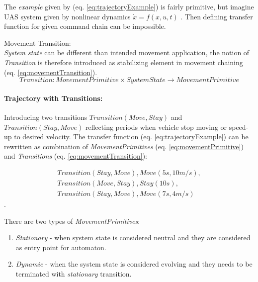     The \emph{example} given by (eq. \ref{eq:trajectoryExample}) is fairly primitive, but imagine UAS system given by nonlinear dynamics $\dot{x}=f(x,u,t)$ \cite{fossen2011mathematical}. Then defining transfer function for given command chain can be impossible.

    \begin{definition}{Movement Transition:}\label{def:movementTransition}\\
        \emph{System state} can be different than intended movement application, the notion of \emph{Transition} is therefore introduced as stabilizing element in movement chaining (eq. \ref{eq:movementTransition}).
        \begin{equation}\label{eq:movementTransition}
            Transition:MovementPrimitive\times SystemState \to MovementPrimitive    
        \end{equation}
    \end{definition}

    \paragraph{Trajectory with Transitions:} Introducing two transitions $Transition(Move,Stay)$ and $Transition(Stay,Move)$ reflecting periods when vehicle stop moving or speed-up to desired velocity. The transfer function (eq. \ref{eq:trajectoryExample}) can be rewritten as combination of \emph{MovementPrimitives} (eq. \ref{eq:movementPrimitive}) and \emph{Transitions} (eq. \ref{eq:movementTransition}):
    
    \begin{multline}
        Transition(Stay,Move), Move(5s,10m/s),\\
        Transition(Move,Stay), Stay(10s),\\ 
        Transition(Stay,Move), Move(7s,4m/s)
    \end{multline}.

    \begin{note} There are two types of \emph{MovementPrimitives}:
    \begin{enumerate}
        \item \emph{Stationary} - when system state is considered neutral and they are considered as entry point for automaton.
        \item \emph{Dynamic} - when the system state is considered evolving and they needs to be terminated with \emph{stationary} transition.
    \end{enumerate}
    \end{note}

